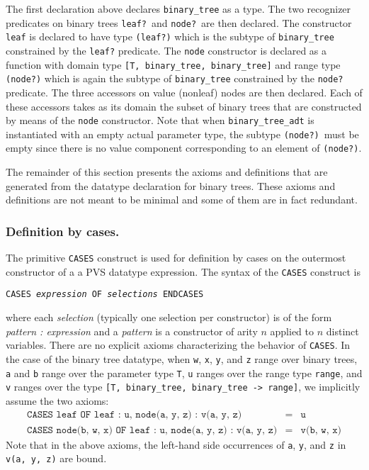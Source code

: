 \documentclass[11pt,twoside]{book}
\begin{document}
The first declaration above declares  \texttt{binary\_tree} as a type.
The two recognizer predicates on binary trees \texttt{leaf?}\ and \texttt{node?}\  are then declared.  The constructor \texttt{leaf} is declared
to have type \texttt{(leaf?)} which is the subtype of \texttt{binary\_tree}
constrained by the \texttt{leaf?} predicate.  The \texttt{node} constructor
is declared as a function with domain type \texttt{[T, binary\_tree,
binary\_tree]} and range type \texttt{(node?)} which is again the subtype of
\texttt{binary\_tree} constrained by the \texttt{node?} predicate.  
The three accessors on value (nonleaf)
nodes are then declared.  Each of these accessors takes as its domain
the subset of binary trees that are constructed by means of the \texttt{node} constructor.  Note that when \texttt{binary\_tree\_adt} is instantiated
with an empty actual parameter type, the subtype \texttt{(node?)}\ must be
empty since there is no value component corresponding to an element
of \texttt{(node?)}\@.


The remainder of this section presents the axioms and definitions that are
generated from the datatype declaration for binary trees.  These axioms
and definitions are not meant to be minimal and some of them are
in fact redundant. 

\subsubsection{Definition by cases. }  The primitive \texttt{CASES} construct is
used for definition by cases on the outermost constructor of a
a PVS datatype expression.  The syntax of the \texttt{CASES} construct
is
\begin{center}
\texttt{CASES~\textit{expression}~OF~\textit{selections}~ENDCASES}
\end{center}
where each \textit{selection} (typically one selection per constructor) is
of the form \textit{pattern : expression} 
and a \emph{pattern} is a constructor of arity $n$ applied to
$n$ distinct variables.  There
are no explicit axioms characterizing the behavior of \texttt{CASES}\@.  
In the case of
the binary tree datatype, when \texttt{w}, \texttt{x}, \texttt{y}, and \texttt{z}
range over binary trees, 
\texttt{a} and \texttt{b} range over the parameter type \texttt{T}, \texttt{u}  ranges over
the range type \texttt{range}, and \texttt{v} ranges over the type
\texttt{[T, binary\_tree, binary\_tree -> range]},  
we implicitly assume the two axioms:
\begin{eqnarray*}
\texttt{{CASES~leaf~OF~leaf~:~u,~node(a,~y,~z)~:~v(a,~y,~z)}} & = & \texttt{u}\\
\texttt{{CASES~node(b,~w,~x)~OF~leaf~:~u,~node(a,~y,~z)~:~v(a,~y,~z)}} & = &
\texttt{v(b,~w,~x)}
\end{eqnarray*}
Note that in the above axioms, the left-hand side occurrences of \texttt{a},
\texttt{y}, and \texttt{z} in \texttt{v(a,~y,~z)} are bound.
\end{document}
